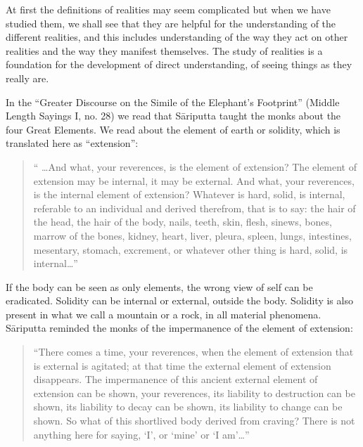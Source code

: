 \documentclass{book}
\begin{document}
At first the definitions of realities may seem complicated but when we
have studied them, we shall see that they are helpful for the
understanding of the different realities, and this includes
understanding of the way they act on other realities and the way they
manifest themselves. The study of realities is a foundation for the
development of direct understanding, of seeing things as they really
are.

In the ``Greater Discourse on the Simile of the Elephant's Footprint''
(Middle Length Sayings I, no. 28) we read that S{\=a}riputta taught the
monks about the four Great Elements. We read about the element of earth
or solidity, which is translated here as ``extension'': 




\begin{quote}\begin{flushleft}``
\dots And what, your reverences, is the element of extension? The
element of extension may be internal, it may be external. And what,
your reverences, is the internal element of extension? Whatever is
hard, solid, is internal, referable to an individual and derived
therefrom, that is to say: the hair of the head, the hair of the body,
nails, teeth, skin, flesh, sinews, bones, marrow of the bones, kidney,
heart, liver, pleura, spleen, lungs, intestines, mesentary, stomach,
excrement, or whatever other thing is hard, solid, is internal\ldots''
\end{flushleft}\end{quote}




If the body can be seen as only elements, the wrong view of self can be
eradicated. Solidity can be internal or external, outside the body.
Solidity is also present in what we call a mountain or a rock, in all
material phenomena. S{\=a}riputta reminded the monks of the
impermanence of the element of extension:




\begin{quote}\begin{flushleft}
``There comes a time, your reverences, when the element of extension
that is external is agitated; at that time the external element of
extension disappears. The impermanence of this ancient external element
of extension can be shown, your reverences, its liability to
destruction can be shown, its liability to decay can be shown, its
liability to change can be shown. So what of this shortlived body
derived from craving? There is not anything here for saying, `I', or
`mine' or `I am'\ldots''
\end{flushleft}\end{quote}
\end{document}
